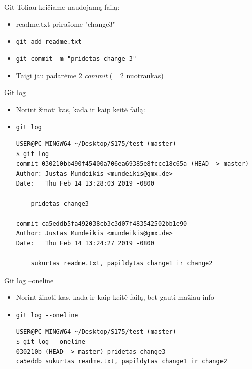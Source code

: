 \documentclass[11pt,xcolor=table]{beamer}
\begin{document}

\begin{frame}[fragile]{Git}
Toliau keičiame naudojamą failą:
\begin{itemize}
\item readme.txt prirašome "change3"
\item \colorbox{listinggray}{\lstinline|git add readme.txt|}
\item \colorbox{listinggray}{\lstinline|git commit -m "pridetas change 3"|}
\item Taigi jau padarėme 2 \textit{commit} (= 2 nuotraukas)
\end{itemize}
\end{frame}

\begin{frame}[fragile]{Git log}
\begin{itemize}
\item Norint žinoti kas, kada ir kaip keitė failą: 
\item \colorbox{listinggray}{\lstinline|git log|}
\begin{lstlisting}
USER@PC MINGW64 ~/Desktop/S175/test (master)
$ git log
commit 030210bb490f45400a706ea69385e8fccc18c65a (HEAD -> master)
Author: Justas Mundeikis <mundeikis@gmx.de>
Date:   Thu Feb 14 13:28:03 2019 -0800

    pridetas change3

commit ca5eddb5fa492038cb3c3d07f483542502bb1e90
Author: Justas Mundeikis <mundeikis@gmx.de>
Date:   Thu Feb 14 13:24:27 2019 -0800

    sukurtas readme.txt, papildytas change1 ir change2

\end{lstlisting}
\end{itemize}
\end{frame}

\begin{frame}[fragile]{Git log --oneline}
\begin{itemize}
\item Norint žinoti kas, kada ir kaip keitė failą, bet gauti mažiau info
\item \colorbox{listinggray}{\lstinline|git log --oneline|}
\begin{lstlisting}
USER@PC MINGW64 ~/Desktop/S175/test (master)
$ git log --oneline
030210b (HEAD -> master) pridetas change3
ca5eddb sukurtas readme.txt, papildytas change1 ir change2
\end{lstlisting}
\end{itemize}
\end{frame}
\end{document}
